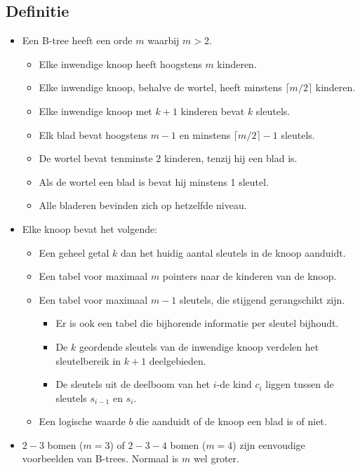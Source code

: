 \subsection{Definitie}
\begin{itemize}
    \item Een B-tree heeft een orde $m$ waarbij $m > 2$.
    \begin{itemize}
        \item Elke inwendige knoop heeft hoogstens $m$ kinderen.
        \item Elke inwendige knoop, behalve de wortel, heeft minstens $\lceil m/2 \rceil$ kinderen.
        \item Elke inwendige knoop met $k + 1$ kinderen bevat $k$ sleutels. 
        \item Elk blad bevat hoogstens $m - 1$ en minstens $\lceil m/2 \rceil - 1$  sleutels.
        \item De wortel bevat tenminste 2 kinderen, tenzij hij een blad is.
        \item Als de wortel een blad is bevat hij minstens 1 sleutel.
        \item Alle bladeren bevinden zich op hetzelfde niveau.
    \end{itemize}
    \item Elke knoop bevat het volgende:
    \begin{itemize}
        \item Een geheel getal $k$ dan het huidig aantal sleutels in de knoop aanduidt.
        \item Een tabel voor maximaal $m$ pointers naar de kinderen van de knoop.
        \item Een tabel voor maximaal $m - 1$ sleutels, die stijgend gerangschikt zijn.
        \begin{itemize}
            \item Er is ook een tabel die bijhorende informatie per sleutel bijhoudt.
            \item De $k$ geordende sleutels van de inwendige knoop verdelen het sleutelbereik in $k + 1$ deelgebieden.
            \item De sleutels uit de deelboom van het $i$-de kind $c_i$ liggen tussen de sleutels $s_{i - 1}$ en $s_i$.
        \end{itemize} 
        \item Een logische waarde $b$ die aanduidt of de knoop een blad is of niet.
    \end{itemize}
    \item $2-3$ bomen ($m=3$) of $2-3-4$ bomen ($m=4$) zijn eenvoudige voorbeelden van B-trees. Normaal is $m$ wel groter.
\end{itemize}


